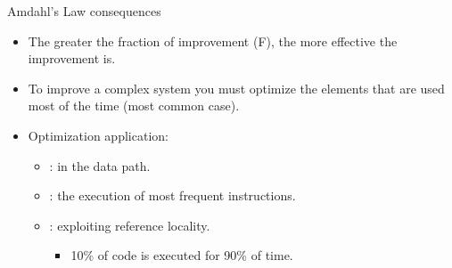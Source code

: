 \begin{frame}[t]{Amdahl's Law consequences}
\begin{itemize}
  \item The greater the fraction of improvement (F),
        the more effective the improvement is.

  \item To improve a complex system you must optimize the
        elements that are used most of the time (most common case).

  \item Optimization application:
    \begin{itemize}
      \item {}: 
            in the data path.
      \item {}: 
            the execution of most frequent instructions.
      \item {}:
            exploiting reference locality.
        \begin{itemize}
          \item 10\% of code is executed for 90\% of time.
        \end{itemize}
    \end{itemize}
\end{itemize}
\end{frame}
